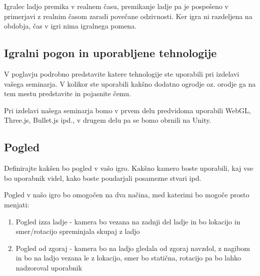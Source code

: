 \documentclass[a4paper]{article}
\begin{document}
Igralec ladjo premika v realnem času, premikanje ladje pa je pospešeno v primerjavi z realnim časom zaradi povečane odzivnosti. Ker igra ni razdeljena na obdobja, čas v igri nima igralnega pomena.

\subsection{Igralni pogon in uporabljene tehnologije}
V poglavju podrobno predstavite katere tehnologije ste uporabili pri izdelavi vašega seminarja. V kolikor ste uporabili kakšno dodatno ogrodje oz. orodje ga na tem mestu predstavite in pojasnite čemu.

Pri izdelavi našega seminarja bomo v prvem delu predvidoma uporabili WebGL, Three.js, Bullet.js ipd., v drugem delu pa se bomo obrnili na Unity.

\subsection{Pogled}
Definirajte kakšen bo pogled v vašo igro. Kakšno kamero boste uporabili, kaj vse bo uporabnik videl, kako boste poudarjali posamezne stvari ipd.

Pogled v našo igro bo omogočen na dva načina, med katerimi bo mogoče prosto menjati:
\begin{enumerate}
\item Pogled izza ladje - kamera bo vezana na zadnji del ladje in bo lokacijo in smer/rotacijo spreminjala skupaj z ladjo
\item Pogled od zgoraj - kamera bo na ladjo gledala od zgoraj navzdol, z nagibom in bo na ladjo vezana le z lokacijo, smer bo statična, rotacijo pa bo lahko nadzoroval uporabnik
\end{enumerate}

\small


\end{document}

